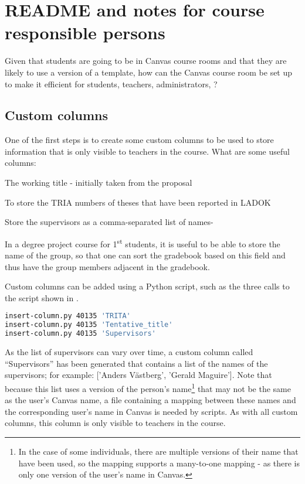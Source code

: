 
\chapter{README and notes for course responsible persons}
\label{ch:readme_course_responible}

Given that students are going to be in Canvas course rooms and that they are likely to use a version of a template, how can the Canvas course room be set up to make it efficient for students, teachers, administrators, \etc?

\section{Custom columns}
\label{sec:CRcustomeCOlumns}

One of the first steps is to create some custom columns to be used to store information that is only visible to teachers in the course. What are some useful columns:
\begin{description}[labelwidth =\widthof{\textbf{Tentative\_title}}, leftmargin = !]
\item[Tentative\_title]  The working title - initially taken from the proposal

\item[TRITA] To store the TRIA numbers of theses that have been reported in LADOK

\item[Supervisors] Store the supervisors as a comma-separated list of names-

\item[Group] In a degree project course for 1\textsuperscript{st} students, it is useful to be able to store the name of the group, so that one can sort the gradebook based on this field and thus have the group members adjacent in the gradebook.
\end{description}

Custom columns can be added using a Python script, such as the three calls to the script shown in .
\begin{lstlisting}[basicstyle=\footnotesize, language={bash}, columns=fullflexible, showstringspaces=false, caption={Adding custom columns to the gradebook},label=lst:CRaddingCustomCOlumns]
insert-column.py 40135 'TRITA'
insert-column.py 40135 'Tentative_title'
insert-column.py 40135 'Supervisors'
\end{lstlisting}

As the list of supervisors can vary over time, a custom column called ``Supervisors'' has been generated that contains a list of the names of the supervisors; for example: ['Anders Västberg', 'Gerald Maguire']. Note that because this list uses a version of the person's name\footnote{In the case of some individuals, there are multiple versions of their name that have been used, so the mapping supports a many-to-one mapping - as there is only one version of the user's name in Canvas.} that may not be the same as the user's Canvas name, a file containing a mapping between these names and the corresponding user's name in Canvas is needed by scripts. As with all custom columns, this column is only visible to teachers in the course.


